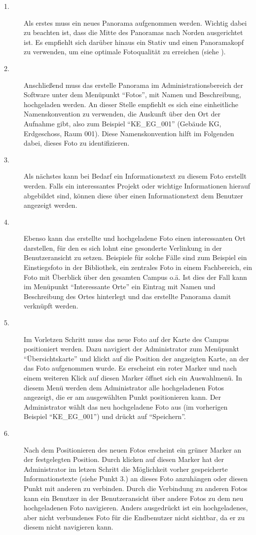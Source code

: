 \begin{description}
  \item[1.] Als erstes muss ein neues Panorama aufgenommen werden. Wichtig dabei zu beachten ist, dass die Mitte des Panoramas nach Norden ausgerichtet ist. Es empfiehlt sich darüber hinaus ein Stativ und einen Panoramakopf zu verwenden, um eine optimale Fotoqualität zu erreichen (siehe ).
  \item[2.] Anschließend muss das erstelle Panorama im Administrationsbereich der Software unter dem Menüpunkt "`Fotos"', mit Namen und Beschreibung, hochgeladen werden. An dieser Stelle empfiehlt es sich eine einheitliche Namenskonvention zu verwenden, die Auskunft über den Ort der Aufnahme gibt, also zum Beispiel "`KE\_EG\_001"' (Gebäude KG, Erdgeschoss, Raum 001). Diese Namenskonvention hilft im Folgenden dabei, dieses Foto zu identifizieren.
  \item[3.] Als nächstes kann bei Bedarf ein Informationstext zu diesem Foto erstellt werden. Falls ein interessantes Projekt oder wichtige Informationen hierauf abgebildet sind, können diese über einen Informationstext dem Benutzer angezeigt werden.
  \item[4.] Ebenso kann das erstellte und hochgeladene Foto einen interessanten Ort darstellen, für den es sich lohnt eine gesonderte Verlinkung in der Benutzeransicht zu setzen. Beispiele für solche Fälle sind zum Beispiel ein Einstiegsfoto in der Bibliothek, ein zentrales Foto in einem Fachbereich, ein Foto mit Überblick über den gesamten Campus o.ä. Ist dies der Fall kann im Menüpunkt "`Interessante Orte"' ein Eintrag mit Namen und Beschreibung des Ortes hinterlegt und das erstellte Panorama damit verknüpft werden.
  \item[5.] Im Vorletzen Schritt muss das neue Foto auf der Karte des Campus positioniert werden. Dazu navigiert der Administrator zum Menüpunkt "`Übersichtskarte"' und klickt auf die Position der angzeigten Karte, an der das Foto aufgenommen wurde. Es erscheint ein roter Marker und nach einem weiteren Klick auf diesen Marker öffnet sich ein Auswahlmenü. In diesem Menü werden dem Administrator alle hochgeladenen Fotos angezeigt, die er am ausgewählten Punkt positionieren kann. Der Administrator wählt das neu hochgeladene Foto aus (im vorherigen Beispiel "`KE\_EG\_001"') und drückt auf "`Speichern"'.
  \item[6.] Nach dem Positionieren des neuen Fotos erscheint ein grüner Marker an der festgelegten Position. Durch klicken auf diesen Marker hat der Administrator im letzen Schritt die Möglichkeit vorher gespeicherte Informationstexte (siehe Punkt 3.) an dieses Foto anzuhängen oder diesen Punkt mit anderen zu verbinden. Durch die Verbindung zu anderen Fotos kann ein Benutzer in der Benutzeransicht über andere Fotos zu dem neu hochgeladenen Foto navigieren. Anders ausgedrückt ist ein hochgeladenes, aber nicht verbundenes Foto für die Endbenutzer nicht sichtbar, da er zu diesem nicht navigieren kann.
\end{description}